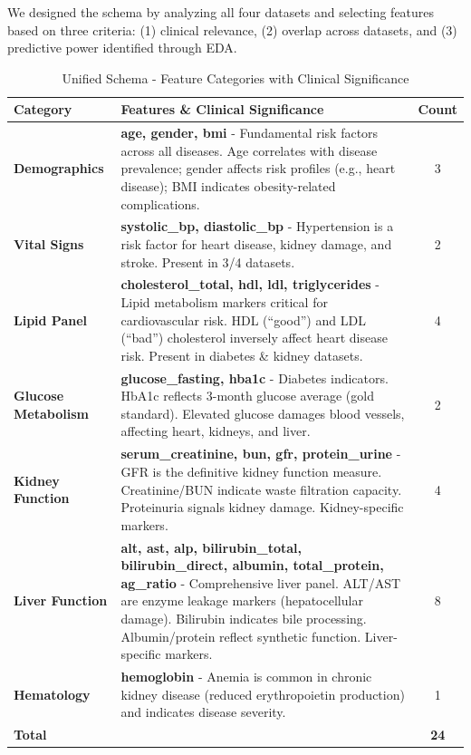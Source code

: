 \documentclass[11pt,a4paper]{article}
\begin{document}
We designed the schema by analyzing all four datasets and selecting features based on three criteria: (1) clinical relevance, (2) overlap across datasets, and (3) predictive power identified through EDA.

\begin{table}[H]
\centering
\caption{Unified Schema - Feature Categories with Clinical Significance}
\small
\begin{tabular}{p{3cm}p{7cm}c}
\toprule
\textbf{Category} & \textbf{Features \& Clinical Significance} & \textbf{Count} \\
\midrule
\textbf{Demographics} & \textbf{age, gender, bmi} - Fundamental risk factors across all diseases. Age correlates with disease prevalence; gender affects risk profiles (e.g., heart disease); BMI indicates obesity-related complications. & 3 \\
\midrule
\textbf{Vital Signs} & \textbf{systolic\_bp, diastolic\_bp} - Hypertension is a risk factor for heart disease, kidney damage, and stroke. Present in 3/4 datasets. & 2 \\
\midrule
\textbf{Lipid Panel} & \textbf{cholesterol\_total, hdl, ldl, triglycerides} - Lipid metabolism markers critical for cardiovascular risk. HDL (``good'') and LDL (``bad'') cholesterol inversely affect heart disease risk. Present in diabetes \& kidney datasets. & 4 \\
\midrule
\textbf{Glucose Metabolism} & \textbf{glucose\_fasting, hba1c} - Diabetes indicators. HbA1c reflects 3-month glucose average (gold standard). Elevated glucose damages blood vessels, affecting heart, kidneys, and liver. & 2 \\
\midrule
\textbf{Kidney Function} & \textbf{serum\_creatinine, bun, gfr, protein\_urine} - GFR is the definitive kidney function measure. Creatinine/BUN indicate waste filtration capacity. Proteinuria signals kidney damage. Kidney-specific markers. & 4 \\
\midrule
\textbf{Liver Function} & \textbf{alt, ast, alp, bilirubin\_total, bilirubin\_direct, albumin, total\_protein, ag\_ratio} - Comprehensive liver panel. ALT/AST are enzyme leakage markers (hepatocellular damage). Bilirubin indicates bile processing. Albumin/protein reflect synthetic function. Liver-specific markers. & 8 \\
\midrule
\textbf{Hematology} & \textbf{hemoglobin} - Anemia is common in chronic kidney disease (reduced erythropoietin production) and indicates disease severity. & 1 \\
\midrule
\textbf{Total} & & \textbf{24} \\
\bottomrule
\end{tabular}
\end{table}
\end{document}
